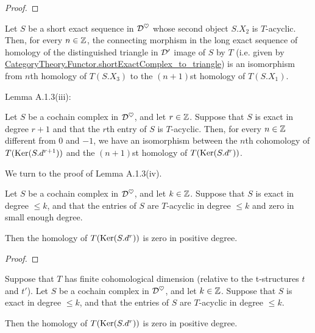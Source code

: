 \begin{proof}
\leanok
\end{proof}


\begin{definition}
\label{def-shortExact_connecting_iso}
\leanok 
{}
Let $S$ be a short exact sequence in $\mathcal{D}^\heartsuit$ whose second object $S.X_2$ is $T$-acyclic. Then, for every 
$n\in\mathbb{Z}$, the connecting
morphism in the long exact sequence of homology of the distinguished triangle in $\mathcal{D}'$ image of $S$ by $T$
(i.e. given by \url{CategoryTheory.Functor.shortExactComplex_to_triangle}) is an isomorphism from $n$th homology of
$T(S.X_3)$ to the $(n + 1)$st homology of $T(S.X_1)$.
\end{definition}

Lemma A.1.3(iii):

\begin{definition}
\label{def-iso_cohomology_of_acyclic_and_exact}
\leanok 
{}
Let $S$ be a cochain complex in $\mathcal{D}^\heartsuit$, and let $r\in\mathbb{Z}$. 
Suppose that $S$ is exact in degree $r + 1$ and that
the $r$th entry of $S$ is $T$-acyclic. Then, for every $n\in\mathbb{Z}$ different from $0$ and $-1$, we have
an isomorphism between the $n$th cohomology of $T(\operatorname{Ker} (S.d^{r+1}))$ and the
$(n + 1)$st homology of $T(\operatorname{Ker} (S.d^r))$.
\end{definition}

We turn to the proof of Lemma A.1.3(iv).

\begin{lemma}
\label{prop-rightAcyclic_ker_of_bounded_complex}
\leanok 
{}
Let $S$ be a cochain complex in $\mathcal{D}^\heartsuit$, and let $k\in\mathbb{Z}$. 
Suppose that $S$ is exact in degree $\le k$, and that
the entries of $S$ are $T$-acyclic in degree $\le k$ and zero in small enough degree.

Then the homology of $T(\operatorname{Ker} (S.d^r))$ is zero in positive degree.

\end{lemma}

\begin{proof}
\leanok
\end{proof}


\begin{lemma}
\label{prop-rightAcyclic_ker_of_bounded_functor}
\leanok 
{}
Suppose that $T$ has finite cohomological dimension (relative to the t-structures $t$ and $t'$).
Let $S$ be a cochain complex in $\mathcal{D}^\heartsuit$, and let $k\in\mathbb{Z}$. 
Suppose that $S$ is exact in degree $\le k$, and that
the entries of $S$ are $T$-acyclic in degree $\le k$.

Then the homology of $T(\operatorname{Ker} (S.d^r))$ is zero in positive degree.

\end{lemma}

